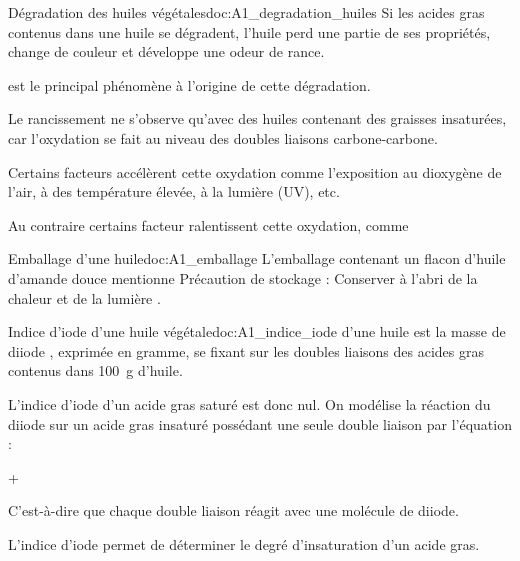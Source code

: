 \newpage
\vspace*{-30pt}


\begin{doc}{Dégradation des huiles végétales}{doc:A1_degradation_huiles}
  Si les acides gras contenus dans une huile se dégradent, l’huile perd une partie de ses propriétés, change de couleur et développe une odeur de rance.
  \begin{importants}  
     est le principal phénomène à l’origine de cette dégradation.
  \end{importants}
  Le rancissement ne s'observe qu'avec des huiles contenant des graisses insaturées, car l'oxydation se fait au niveau des doubles liaisons carbone-carbone.
  \begin{importants}  
    Certains facteurs accélèrent cette oxydation comme l’exposition au dioxygène de l’air, à des température élevée, à la lumière (UV), etc.
  \end{importants}
  \begin{importants}
    Au contraire certains facteur ralentissent cette oxydation, comme 
  \end{importants}
\end{doc}



\begin{doc}{Emballage d'une huile}{doc:A1_emballage}  
  L'emballage contenant un flacon d'huile d'amande douce mentionne \og Précaution de stockage : Conserver à l’abri de la chaleur et de la lumière \fg.
\end{doc}



\begin{doc}{Indice d’iode d’une huile végétale}{doc:A1_indice_iode}
   d'une huile est la masse de diiode \diiode, exprimée en gramme, se fixant sur les doubles liaisons des acides gras contenus dans \qty{100}{g} d’huile.
  
  L'indice d'iode d'un acide gras saturé est donc nul.
  On modélise la réaction du diiode \diiode sur un acide gras insaturé possédant une seule double liaison par l’équation :
  \begin{center}
     + \diiode \reaction {}
  \end{center}
  C'est-à-dire que chaque double liaison réagit avec une molécule de diiode.

  \begin{importants}
    L'indice d'iode permet de déterminer le degré d'insaturation d'un acide gras.
  \end{importants}
\end{doc}


